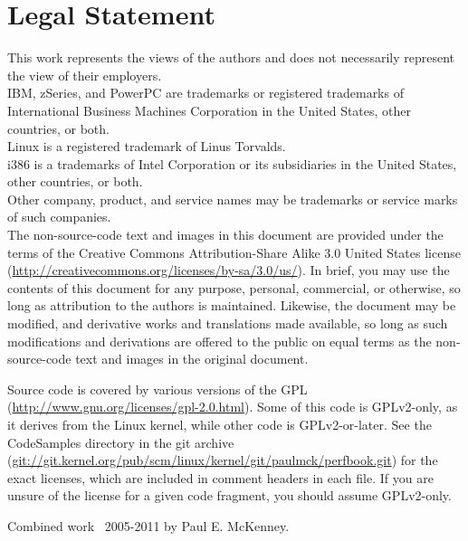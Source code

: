 
\section*{Legal Statement}

{ \small
This work represents the views of the authors and does not necessarily
represent the view of their employers.\\
IBM, zSeries, and PowerPC are trademarks or registered trademarks of
International Business Machines Corporation in the United States,
other countries, or both.\\
Linux is a registered trademark of Linus Torvalds.\\
i386 is a trademarks of Intel Corporation or its
subsidiaries in the United States, other countries, or both. \\
Other company, product, and service names may be trademarks or service marks
of such companies.\\

The non-source-code text and images in this document are provided under
the terms of the Creative Commons Attribution-Share Alike 3.0 United
States license
(\url{http://creativecommons.org/licenses/by-sa/3.0/us/}).
In brief, you may use the contents of this document for any purpose,
personal, commercial, or otherwise, so long as attribution to the
authors is maintained.  Likewise, the document may be modified,
and derivative works and translations made available, so long as
such modifications and derivations are offered to the public on equal
terms as the non-source-code text and images in the original document.

Source code is covered by various versions of the GPL
(\url{http://www.gnu.org/licenses/gpl-2.0.html}).
Some of this code is GPLv2-only, as it derives from the Linux kernel,
while other code is GPLv2-or-later.
See the CodeSamples directory in the git archive
(\url{git://git.kernel.org/pub/scm/linux/kernel/git/paulmck/perfbook.git})
for the exact licenses, which are included in comment headers in each file.
If you are unsure of the license for a given code fragment,
you should assume GPLv2-only.

Combined work {\textcopyright}~2005-2011 by Paul E. McKenney.
}
